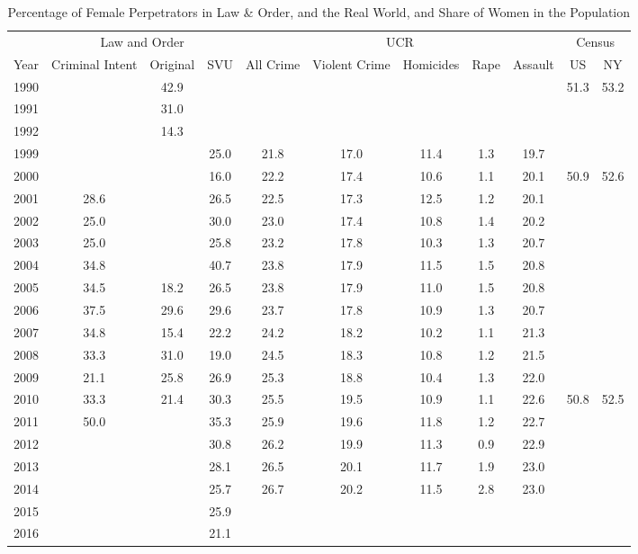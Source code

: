 \begin{table}[!htb]
\centering
\caption{Percentage of Female Perpetrators in Law \& Order, and the Real World, and Share of Women in the Population} 
\label{tab:c_sex}
\begingroup\tiny
\begin{tabular}{ccccccccccc}
  \toprule
   & \multicolumn{3}{c}{{Law and Order}} & \multicolumn{5}{c}{{UCR}} & \multicolumn{2}{c}{{Census}}\\
 \cmidrule(lr){2-4}\cmidrule(lr){5-9}\cmidrule(lr){10-11}
 {Year} & {Criminal Intent} & {Original} & {SVU} & {All Crime} & {Violent Crime} & {Homicides} & {Rape} & {Assault} & {US} & {NY}\\
 \midrule
1990 &  & 42.9 &  &  &  &  &  &  & 51.3 & 53.2 \\ 
  1991 &  & 31.0 &  &  &  &  &  &  &  &  \\ 
  1992 &  & 14.3 &  &  &  &  &  &  &  &  \\ 
  1999 &  &  & 25.0 & 21.8 & 17.0 & 11.4 & 1.3 & 19.7 &  &  \\ 
  2000 &  &  & 16.0 & 22.2 & 17.4 & 10.6 & 1.1 & 20.1 & 50.9 & 52.6 \\ 
  2001 & 28.6 &  & 26.5 & 22.5 & 17.3 & 12.5 & 1.2 & 20.1 &  &  \\ 
  2002 & 25.0 &  & 30.0 & 23.0 & 17.4 & 10.8 & 1.4 & 20.2 &  &  \\ 
  2003 & 25.0 &  & 25.8 & 23.2 & 17.8 & 10.3 & 1.3 & 20.7 &  &  \\ 
  2004 & 34.8 &  & 40.7 & 23.8 & 17.9 & 11.5 & 1.5 & 20.8 &  &  \\ 
  2005 & 34.5 & 18.2 & 26.5 & 23.8 & 17.9 & 11.0 & 1.5 & 20.8 &  &  \\ 
  2006 & 37.5 & 29.6 & 29.6 & 23.7 & 17.8 & 10.9 & 1.3 & 20.7 &  &  \\ 
  2007 & 34.8 & 15.4 & 22.2 & 24.2 & 18.2 & 10.2 & 1.1 & 21.3 &  &  \\ 
  2008 & 33.3 & 31.0 & 19.0 & 24.5 & 18.3 & 10.8 & 1.2 & 21.5 &  &  \\ 
  2009 & 21.1 & 25.8 & 26.9 & 25.3 & 18.8 & 10.4 & 1.3 & 22.0 &  &  \\ 
  2010 & 33.3 & 21.4 & 30.3 & 25.5 & 19.5 & 10.9 & 1.1 & 22.6 & 50.8 & 52.5 \\ 
  2011 & 50.0 &  & 35.3 & 25.9 & 19.6 & 11.8 & 1.2 & 22.7 &  &  \\ 
  2012 &  &  & 30.8 & 26.2 & 19.9 & 11.3 & 0.9 & 22.9 &  &  \\ 
  2013 &  &  & 28.1 & 26.5 & 20.1 & 11.7 & 1.9 & 23.0 &  &  \\ 
  2014 &  &  & 25.7 & 26.7 & 20.2 & 11.5 & 2.8 & 23.0 &  &  \\ 
  2015 &  &  & 25.9 &  &  &  &  &  &  &  \\ 
  2016 &  &  & 21.1 &  &  &  &  &  &  &  \\ 
   \bottomrule
\end{tabular}
\endgroup
\end{table}
